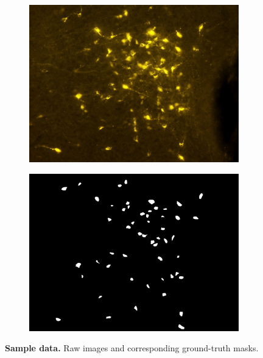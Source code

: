 \begin{figure}
\begin{subfigure}{0.5\textwidth}
\includegraphics[width=\linewidth]{figures/120_dataset/i_257.jpeg}
\label{fig:dataset:bright}
\end{subfigure}
\begin{subfigure}{0.5\textwidth}
\includegraphics[width=\linewidth]{figures/120_dataset/m_257.png}
\label{fig:dataset:bright_mask}
\end{subfigure}
\caption{
\textbf{Sample data.} 
Raw images and corresponding ground-truth masks.
} \label{fig:dataset}
\end{figure}%
